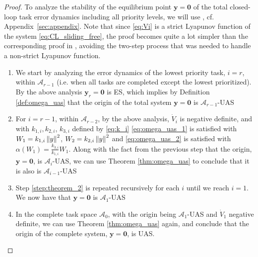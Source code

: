 \documentclass[../main.tex]{subfiles}
\begin{document}
\begin{proof}


    To analyze the stability of the equilibrium point $\bm{y}=\bm{0}$ of the total closed-loop task error dynamics including all priority levels, we will use \cite[Theorem 2]{Wang2008}, cf. Appendix~\ref{sec:appendix}. Note that since \eqref{eq:Vi} is a strict Lyapunov function of the system \eqref{eq:CL_sliding_free}, the proof becomes quite a lot simpler than the corresponding proof in \cite{dietrich2020}, avoiding the two-step process that was needed to handle a non-strict Lyapunov function.

    \begin{enumerate}
        \item  We start by analyzing the error dynamics of the   lowest priority task, $i = r$, within $\mathcal{A}_{r-1}$ (i.e. when all tasks are completed except the lowest prioritized). By the above analysis $\bm{y}_r = \bm{0}$ is ES, which implies by Definition \ref{def:omega_uas} that the origin of the total system $\bm{y} = \bm{0}$ is $\mathcal{A}_{r-1}$-UAS

        \item \label{step:theorem_2}
        For $i = r - 1$, within $\mathcal{A}_{r-2}$, by the above analysis, $\dot{V}_i$ is negative definite, and with $k_{1,i}, k_{2,i}$, $k_{3,i}$ defined by \eqref{eq:k_i} \eqref{eq:omega_uas_1} is satisfied with $W_1 = k_{1,i}\left\lVert y\right\rVert^2$, $W_2 = k_{2,i}\left\lVert y\right\rVert^2$ and \eqref{eq:omega_uas_2} is satisfied with $\alpha(W_1) = \frac{k_{3,i}}{k_{1,i}} W_1$. Along with the fact from the previous step that the origin, $\bm{y} = \bm{0}$, is $\mathcal{A}_{i}$-UAS, we can use Theorem \ref{thm:omega_uas} to conclude that it is also is $\mathcal{A}_{i-1}$-UAS

        \item Step \ref{step:theorem_2} is repeated recursively for each $i$ until we reach $i = 1$. We now have that $\bm{y} = \bm{0}$ is $\mathcal{A}_{1}$-UAS

        \item In the complete task space $\mathcal{A}_{0}$, with the origin being $\mathcal{A}_{1}$-UAS and $\dot{V}_1$ negative definite, we can use Theorem \ref{thm:omega_uas} again, and conclude that the origin of the complete system, $\bm{y} = \bm{0}$, is UAS.


\end{enumerate}
\end{proof}
\end{document}
